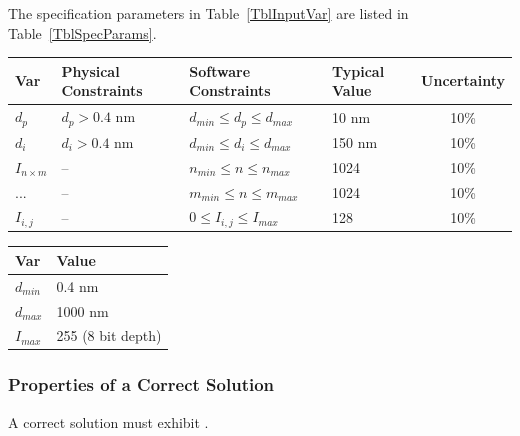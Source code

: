 \documentclass[12pt]{article}
\begin{document}
The specification parameters in Table~\ref{TblInputVar} are listed in
Table~\ref{TblSpecParams}.

\begin{table}[!h]
  \caption{Input Variables} \label{TblInputVar}
  \renewcommand{\arraystretch}{1.2}
\noindent \begin{longtable*}{l l l l c} 
  \toprule
  \textbf{Var} & \textbf{Physical Constraints} & \textbf{Software Constraints} &
                             \textbf{Typical Value} & \textbf{Uncertainty}\\
  \midrule 
  $d_p$ & $d_p > 0.4$ \si{nm} & $d_{min} \leq d_p \leq d_{max}$ & 10 \si{nm} & 10\% \\
  $d_i$ & $d_i > 0.4$ \si{nm} & $d_{min} \leq d_i \leq d_{max}$ & 150 \si{nm} & 10\% \\
  $I_{n \times m}$ & -- & $n_{min} \leq n \leq n_{max}$ & 1024 & 10\% \\
   ... & -- & $m_{min} \leq n \leq m_{max}$ & 1024 & 10\% \\
  $I_{i,j}$ & -- & $0 \leq I_{i,j} \leq I_{max}$ & 128 & 10\% \\
  \bottomrule
\end{longtable*}
\end{table}

\begin{table}[!h]
\caption{Specification Parameter Values} \label{TblSpecParams}
\renewcommand{\arraystretch}{1.2}
\noindent \begin{longtable*}{l l} 
  \toprule
  \textbf{Var} & \textbf{Value} \\
  \midrule 
  $d_{min}$ & 0.4 \si{\nm}\\
  $d_{max}$ & 1000 \si{\nm}\\
  $I_{max}$ & 255 (8 bit depth)\\
  \bottomrule
\end{longtable*}
\end{table}

\subsubsection{Properties of a Correct Solution} \label{sec_CorrectSolution}

\noindent
A correct solution must exhibit .  
\end{document}
